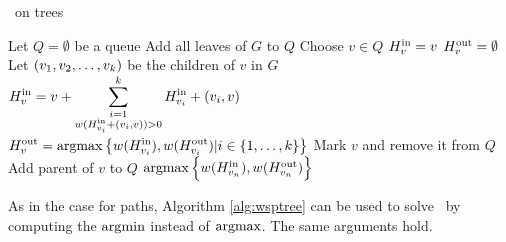 \begin{algorithm}[h]
	\caption{\maxWSP\ on trees}
	\label{alg:wsptree}
	\begin{algorithmic}[1]
		\State Let $Q = \emptyset$ be a queue
		\State Add all leaves of $G$ to $Q$
		\State Choose $v\in Q$
		\State $\HPath{v}{in} = v$
		\State $\HPath{v}{out} = \emptyset$
		\Else
		\State Let $\Vector[v]{k}$ be the children of $v$ in $G$
		\State ${\displaystyle \HPath{v}{in} = v + \sum_{\substack{i=1 \\ w(\HPath{v_i}{in} + (v_i, v)) > 0}}^{k} \HPath{v_i}{in} + (v_i, v)}$
		\State ${\displaystyle \HPath{v}{out} = \argmax \left \{ w(\HPath{v_i}{in}), w(\HPath{v_i}{out}) | i\in \{1,\ldots,k\} \right \}}$
		\EndIf
		\State Mark $v$ and remove it from $Q$
		\State Add parent of $v$ to $Q$
		\EndIf
		\EndWhile
		\State\Return $\argmax \Big\{w(\HPath{v_n}{in}), w(\HPath{v_n}{out}) \Big\}$
		\EndProcedure
	\end{algorithmic}
\end{algorithm}

As in the case for paths, Algorithm \ref{alg:wsptree} can be used to solve \minWSP\ by computing the $\argmin$ instead of $\argmax$. The same arguments hold.

